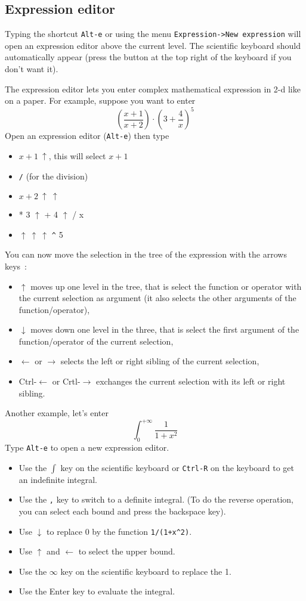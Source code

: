\documentclass{article}
\begin{document}
\subsection{Expression editor} \label{sec:eqw}
Typing the shortcut {\tt Alt-e} 
or using the menu {\tt Expression->New expression} will
open an expression editor above the current level. The scientific
keyboard should automatically appear (press the  button at the 
top right of the keyboard if you don't want it).

The expression editor lets you enter complex mathematical expression
in 2-d like on a paper. 
For example, suppose you want to enter
\[ \left(\frac{x+1}{x+2}\right) \cdot \left(3+\frac{4}{x} \right)^5 \]
Open an expression editor ({\tt Alt-e}) then type
\begin{itemize}
\item $x+1 \ \uparrow$, this will select $x+1$
\item \verb|/| (for the division)
\item $x+2 \ \uparrow \ \uparrow$
\item
* 3 $\uparrow$ + 4 $\uparrow$ / x
\item
$\uparrow \ \uparrow \ \uparrow$ \verb|^| 5
\end{itemize}
You can now move the selection in the tree of the expression
with the arrows keys~:
\begin{itemize}
\item $\uparrow$ moves up one level in the tree, that is select the
function or operator with the current selection as argument 
(it also selects the other arguments of the function/operator),
\item $\downarrow$ moves down one level in the three, that is select
the first argument of the function/operator of the current selection,
\item $\leftarrow$ or $\rightarrow$ selects the left or right sibling 
of the current selection,
\item Ctrl-$\leftarrow$ or Crtl-$\rightarrow$ exchanges the current selection
with its left or right sibling.
\end{itemize}

Another example, let's enter
\[ \int_0^{+\infty} \frac{1}{1+x^2} \]
Type {\tt Alt-e} to open a new expression editor.
\begin{itemize}
\item Use the $\int$ key on the scientific keyboard or {\tt Ctrl-R} on
the keyboard to get an indefinite integral.
\item Use the \verb|,| key to switch to a definite integral.  (To do the
reverse operation, you can select each bound and press the backspace
key).
\item Use $\downarrow$ to replace 0 by the function \verb|1/(1+x^2)|.

\item Use $\uparrow$ and $\leftarrow$ to select the upper bound.
\item Use the $\infty$ key on the scientific keyboard to replace the 1.
\item Use the Enter key to evaluate the integral.
\end{itemize}
\end{document}
